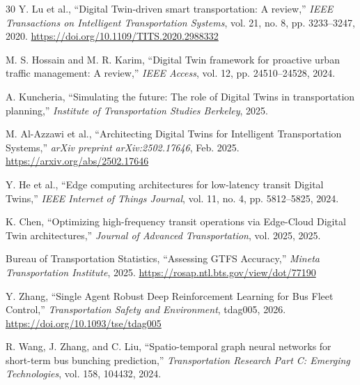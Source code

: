 \documentclass[journal,twocolumn]{IEEEtran}
\begin{document}
\begin{thebibliography}{30}
	 Y. Lu et al., ``Digital Twin-driven smart transportation: A review,'' \textit{IEEE Transactions on Intelligent Transportation Systems}, vol. 21, no. 8, pp. 3233--3247, 2020. \url{https://doi.org/10.1109/TITS.2020.2988332}

	 M. S. Hossain and M. R. Karim, ``Digital Twin framework for proactive urban traffic management: A review,'' \textit{IEEE Access}, vol. 12, pp. 24510--24528, 2024.

	 A. Kuncheria, ``Simulating the future: The role of Digital Twins in transportation planning,'' \textit{Institute of Transportation Studies Berkeley}, 2025.

	 M. Al-Azzawi et al., ``Architecting Digital Twins for Intelligent Transportation Systems,'' \textit{arXiv preprint arXiv:2502.17646}, Feb. 2025. \url{https://arxiv.org/abs/2502.17646}

	 Y. He et al., ``Edge computing architectures for low-latency transit Digital Twins,'' \textit{IEEE Internet of Things Journal}, vol. 11, no. 4, pp. 5812--5825, 2024.

	 K. Chen, ``Optimizing high-frequency transit operations via Edge-Cloud Digital Twin architectures,'' \textit{Journal of Advanced Transportation}, vol. 2025, 2025.

	 Bureau of Transportation Statistics, ``Assessing GTFS Accuracy,'' \textit{Mineta Transportation Institute}, 2025. \url{https://rosap.ntl.bts.gov/view/dot/77190}

	 Y. Zhang, ``Single Agent Robust Deep Reinforcement Learning for Bus Fleet Control,'' \textit{Transportation Safety and Environment}, tdag005, 2026. \url{https://doi.org/10.1093/tse/tdag005}

	 R. Wang, J. Zhang, and C. Liu, ``Spatio-temporal graph neural networks for short-term bus bunching prediction,'' \textit{Transportation Research Part C: Emerging Technologies}, vol. 158, 104432, 2024.

\end{thebibliography}
\end{document}
